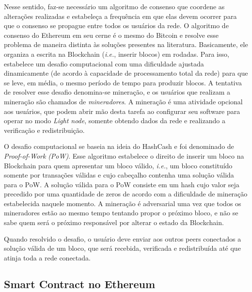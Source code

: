 \documentclass[a4paper,11pt]{article}
\begin{document}
Nesse sentido, faz-se necessário um algoritmo de consenso que coordene as alterações realizadas e estabeleça a frequência em que elas devem ocorrer para que o consenso se propague entre todos os usuários da rede.
O algoritmo de consenso do Ethereum em seu cerne é o mesmo do Bitcoin e resolve esse problema de maneira distinta às soluções presentes na literatura. Basicamente, ele organiza a escrita na Blockchain (\emph{i.e.}, inserir blocos) em rodadas. Para isso, estabelece um desafio computacional com uma dificuldade ajustada dinamicamente (de acordo à capacidade de processamento total da rede) para que se leve, em média, o mesmo período de tempo para produzir blocos.
A tentativa de resolver esse desafio denomina-se mineração, e os usuários que realizam a mineração são chamados de \emph{mineradores}.
A mineração é uma atividade opcional aos usuários, que podem abrir mão desta tarefa ao configurar seu software para operar no modo \emph{Light node}, somente obtendo dados da rede e realizando a verificação e redistribuição.

O desafio computacional se baseia na ideia do HashCash \cite{Back2002} e foi denominado de \emph{Proof-of-Work} \emph{(PoW)}.
Esse algoritmo estabelece o direito de inserir um bloco na Blockchain para quem apresentar um bloco válido, \emph{i.e.}, um bloco constituído somente por transações válidas e cujo cabeçalho contenha uma solução válida para o PoW.
A solução válida para o PoW consiste em um hash cujo valor seja precedido por uma quantidade de zeros de acordo com a dificuldade de mineração estabelecida naquele momento.
A mineração é adversarial uma vez que todos os mineradores estão ao mesmo tempo tentando propor o próximo bloco, e não se sabe quem será o próximo responsável por alterar o estado da Blockchain.

Quando resolvido o desafio, o usuário deve enviar aos outros peers conectados a solução válida de um bloco, que será recebida, verificada e redistribuída até que atinja toda a rede conectada.

\subsection{Smart Contract no Ethereum} \label{sec:sub:contratos-ethereum}
\end{document}
